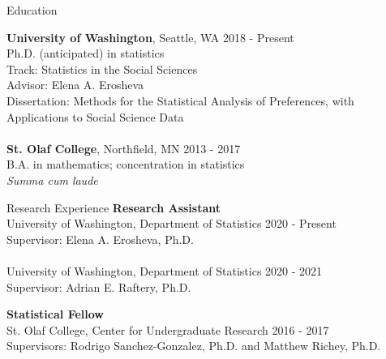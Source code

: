 \documentclass{resume} %
\begin{document}

\begin{rSection}{Education}

{\bf University of Washington}, Seattle, WA \hfill {2018 - Present} 
\\ Ph.D. (anticipated) in statistics
\\ Track: Statistics in the Social Sciences
\\ Advisor: Elena A. Erosheva
\\ Dissertation: Methods for the Statistical Analysis of Preferences, with Applications to Social Science Data
\\
\\{\bf St. Olaf College}, Northfield, MN \hfill {2013 - 2017} 
\\ B.A. in mathematics; concentration in statistics
\\ {\it Summa cum laude}
\end{rSection}

\begin{rSection}{Research Experience}
{\bf Research Assistant}
\\ University of Washington, Department of Statistics \hfill {2020 - Present}
\\ Supervisor: Elena A. Erosheva, Ph.D.
\\
\\ University of Washington, Department of Statistics \hfill {2020 - 2021}
\\ Supervisor: Adrian E. Raftery, Ph.D.

{\bf Statistical Fellow} 
\\ St. Olaf College, Center for Undergraduate Research \hfill {2016 - 2017}
\\ Supervisors: Rodrigo Sanchez-Gonzalez, Ph.D. and Matthew Richey, Ph.D.
\end{rSection}
\end{document}
